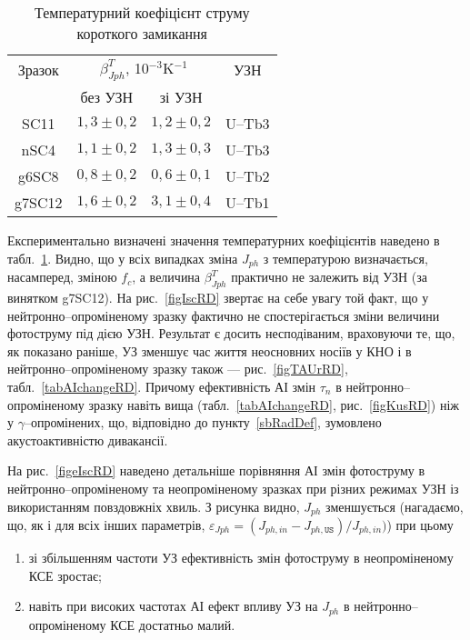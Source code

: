 \begin{table}[b]
\caption{\label{tabIscT}Температурний коефіцієнт струму короткого замикання
}
\center
\begin{tabular}{|c|c|c|c|}
\hline
Зразок&\multicolumn{2}{c|}{$\beta^T_{Jph}$, 10$^{-3}$K$^{-1}$}&УЗН\\ \cline{2-3}
&без УЗН & зі УЗН&\\ \hline
SC11&$1,3\pm0,2$&$1,2\pm0,2$&U--Tb3\\ \hline
nSC4&$1,1\pm0,2$&$1,3\pm0,3$&U--Tb3\\ \hline
g6SC8&$0,8\pm0,2$&$0,6\pm0,1$&U--Tb2\\ \hline
g7SC12&$1,6\pm0,2$&$3,1\pm0,4$&U--Tb1\\ \hline
\end{tabular}
\end{table}

Експериментально визначені значення температурних коефіцієнтів наведено в табл.~\ref{tabIscT}.
Видно, що у всіх випадках зміна $J_{ph}$ з температурою визначається, насамперед,
зміною $f_c$, а величина $\beta^T_{Jph}$ практично не залежить від УЗН (за винятком g7SC12).
На рис.~\ref{figIscRD} звертає на себе увагу той факт, що у нейтронно--опроміненому
зразку фактично не спостерігається зміни величини фотоструму під дією УЗН.
Результат є досить несподіваним, враховуючи те, що, як показано раніше,
УЗ зменшує час життя неосновних носіїв у КНО і в нейтронно--опроміненому зразку також ---
 рис.~\ref{figTAUrRD}, табл.~\ref{tabAIchangeRD}.
Причому ефективність АІ змін $\tau_n$ в нейтронно--опроміненому зразку навіть вища (табл.~\ref{tabAIchangeRD}, рис.~\ref{figKusRD}) ніж у $\gamma$--опромінених,
що, відповідно до пункту~\ref{sbRadDef}, зумовлено акустоактивністю дивакансії.

На рис.~\ref{figeIscRD} наведено детальніше порівняння АІ змін фотоструму в нейтронно--опроміненому та неопроміненому
зразках при різних режимах УЗН із використанням повздовжніх хвиль.
З рисунка видно, $J_{ph}$ зменшується (нагадаємо, що, як і для всіх інших параметрів, $\varepsilon_{Jph}=(J_{ph,in}-J_{ph,\mathtt{US}})/{J_{ph,in}})$) при цьому
\begin{enumerate}[label=\asbuk*),leftmargin=0em,itemindent=1.5em]
\item зі збільшенням частоти УЗ ефективність змін фотоструму в неопроміненому КСЕ зростає;
\item навіть при високих частотах АІ ефект впливу УЗ на $J_{ph}$ в нейтронно--опроміненому КСЕ достатньо малий.
\end{enumerate}


